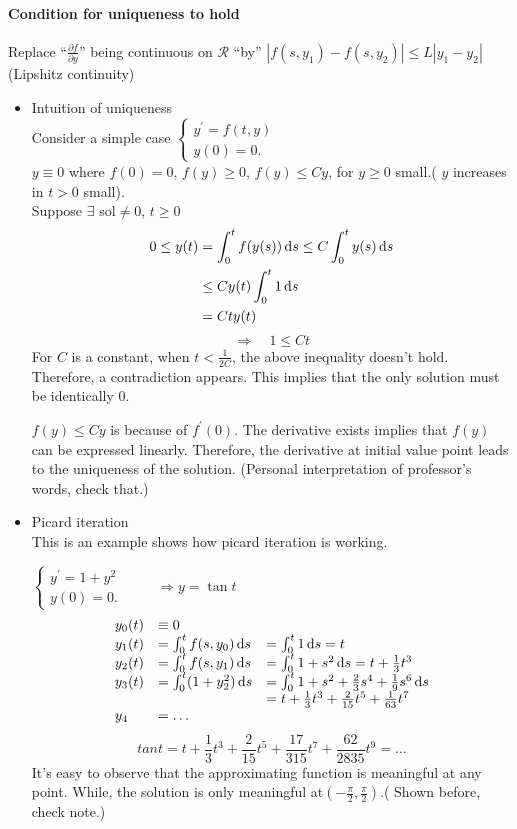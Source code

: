 \paragraph{Condition for uniqueness to hold}Replace ``$\frac{\partial f}{\partial y}$'' being continuous on $\mathcal{R}$ ``by'' $|f(s,y_1)-f(s,y_2)|\leq L|y_1-y_2|$ (Lipshitz continuity)

\begin{remark}
\begin{itemize}
\item 
Intuition of uniqueness\\
Consider a simple case
 $\left \{	\begin{gathered}
y^\prime=f(t,y)	\\
y(0)=0.
\end{gathered}\right.$ \\$y\equiv0$ where $f(0)=0$, $f(y)\geq0$, $f(y)\leq Cy$, for $y\geq0$ small.( $y$ increases in $t>0$ small).\\
Suppose $\exists$ sol$\neq0$, $t\geq0$\\
\[\begin{aligned}0\leq y(t)&=\int_0^tf(y(s))\,\mathrm{d} s\leq C\int_0^ty(s)\,\mathrm{d} s\\
&\leq Cy(t)\int_0^t1\,\mathrm{d} s\\
&=Cty(t)
\end{aligned}
\]
\[\Rightarrow\quad 1\leq Ct 
\]
For $C$ is a constant, when $t<\frac{1}{2C}$, the above inequality doesn't hold. Therefore, a contradiction appears. This implies that the only solution must be identically 0.

$f(y)\leq Cy$ is because of $f^\prime(0)$. The derivative exists implies that $f(y)$ can be expressed linearly. Therefore, the derivative at initial value point leads to the uniqueness of the solution. (Personal interpretation of professor's words, check that.)
\item
Picard iteration\\
This is an example shows how picard iteration is working.
\begin{example}
 $\left \{	\begin{gathered}
y^\prime=1+y^2	\\
y(0)=0.
\end{gathered}\right.$ $\qquad\Rightarrow y=\tan t$
\[
\begin{array}{lll}
y_0(t)&\equiv0&\\
y_1(t)&=\int_0^tf(s,y_0)\,\mathrm{d} s&=\int_0^t1\,\mathrm{d} s=t\\
y_2(t)&=\int_0^tf(s,y_1)\,\mathrm{d} s&=\int_0^t1+s^2\,\mathrm{d} s=t+\frac{1}{3}t^3\\
y_3(t)&=\int_0^t(1+y_2^2)\,\mathrm{d} s&=\int_0^t1+s^2+\frac{2}{3}s^4+\frac{1}{9}s^6\,\mathrm{d} s\\
&&=t+\frac{1}{3}t^3+\frac{2}{15}t^5+\frac{1}{63}t^7\\
y_4&=\dots
\end{array}
\]
\[tant=t+\frac{1}{3}t^3+\frac{2}{15}t^5+\frac{17}{315}t^7+\frac{62}{2835}t^9=\dots
\]
It's easy to observe that the approximating function is meaningful at any point. While, the solution is only meaningful at$(-\frac{\pi}{2},\frac{\pi}{2})$.( Shown before, check note.)\\


\end{example}
\end{itemize}
\end{remark}
